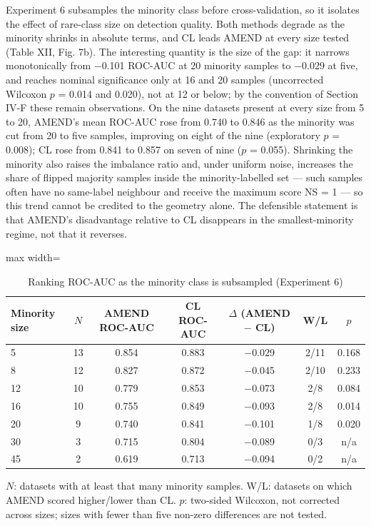 \documentclass[conference]{IEEEtran}
\begin{document}
Experiment 6 subsamples the minority class before cross-validation, so it isolates the effect of rare-class size on detection quality. Both methods degrade as the minority shrinks in absolute terms, and CL leads AMEND at every size tested (Table XII, Fig. 7b). The interesting quantity is the size of the gap: it narrows monotonically from $-$0.101 ROC-AUC at 20 minority samples to $-$0.029 at five, and reaches nominal significance only at 16 and 20 samples (uncorrected Wilcoxon $p$ = 0.014 and 0.020), not at 12 or below; by the convention of Section IV-F these remain observations. On the nine datasets present at every size from 5 to 20, AMEND's mean ROC-AUC rose from 0.740 to 0.846 as the minority was cut from 20 to five samples, improving on eight of the nine (exploratory $p$ = 0.008); CL rose from 0.841 to 0.857 on seven of nine ($p$ = 0.055). Shrinking the minority also raises the imbalance ratio and, under uniform noise, increases the share of flipped majority samples inside the minority-labelled set --- such samples often have no same-label neighbour and receive the maximum score NS = 1 --- so this trend cannot be credited to the geometry alone. The defensible statement is that AMEND's disadvantage relative to CL disappears in the smallest-minority regime, not that it reverses.

\begin{table}[!t]
\centering
\footnotesize
\caption{Ranking ROC-AUC as the minority class is subsampled (Experiment 6)}
\label{tab:12}
\setlength{\tabcolsep}{3.5pt}
\begin{adjustbox}{max width=\linewidth}
\begin{tabular}{lcccccc}
\hline
Minority size & $N$ & AMEND ROC-AUC & CL ROC-AUC & $\Delta $ (AMEND $-$ CL) & W/L & $p$ \\
\hline
5 & 13 & 0.854 & 0.883 & $-$0.029 & 2/11 & 0.168 \\
8 & 12 & 0.827 & 0.872 & $-$0.045 & 2/10 & 0.233 \\
12 & 10 & 0.779 & 0.853 & $-$0.073 & 2/8 & 0.084 \\
16 & 10 & 0.755 & 0.849 & $-$0.093 & 2/8 & 0.014 \\
20 & 9 & 0.740 & 0.841 & $-$0.101 & 1/8 & 0.020 \\
30 & 3 & 0.715 & 0.804 & $-$0.089 & 0/3 & n/a \\
45 & 2 & 0.619 & 0.713 & $-$0.094 & 0/2 & n/a \\
\hline
\end{tabular}
\end{adjustbox}
\par\vspace{3pt}
\begin{minipage}{\linewidth}\scriptsize $N$: datasets with at least that many minority samples. W/L: datasets on which AMEND scored higher/lower than CL. $p$: two-sided Wilcoxon, not corrected across sizes; sizes with fewer than five non-zero differences are not tested.\end{minipage}
\end{table}
\end{document}

